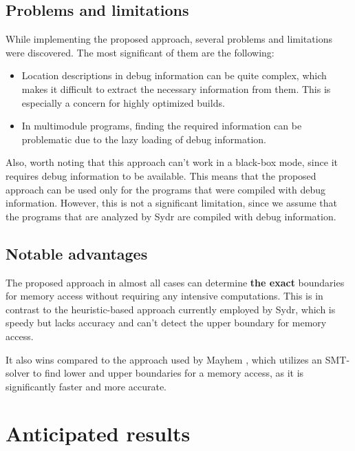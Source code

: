 \documentclass[conference]{IEEEtran}
\begin{document}
\subsection{Problems and limitations}

While implementing the proposed approach, several problems and limitations were discovered. The most significant of them are the following:

\begin{itemize}
    \item Location descriptions in debug information can be quite complex, which makes it difficult to extract the necessary information from them. This is especially a concern for highly optimized builds.
    \item In multimodule programs, finding the required information can be problematic due to the lazy loading of debug information.
\end{itemize}

Also, worth noting that this approach can't work in a black-box mode, since it requires debug information to be available. This means that the proposed approach can be used only for the programs that were compiled with debug information. However, this is not a significant limitation, since we assume that the programs that are analyzed by Sydr are compiled with debug information.

\subsection{Notable advantages}

The proposed approach in almost all cases can determine \textbf{the exact} boundaries for memory access without requiring any intensive computations. This is in contrast to the heuristic-based approach currently employed by Sydr, which is speedy but lacks accuracy and can't detect the upper boundary for memory access.

It also wins compared to the approach used by Mayhem \cite{unleashing-mayhem-on-binary-code}, which utilizes an SMT-solver to find lower and upper boundaries for a memory access, as it is significantly faster and more accurate.


\section{Anticipated results}
\end{document}

